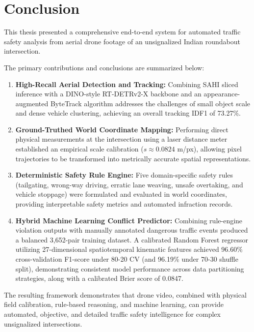 \chapter{Conclusion}
\label{chap:conclusion}

This thesis presented a comprehensive end-to-end system for automated traffic safety analysis from aerial drone footage of an unsignalized Indian roundabout intersection.

The primary contributions and conclusions are summarized below:
\begin{enumerate}
    \item \textbf{High-Recall Aerial Detection and Tracking:} Combining SAHI sliced inference with a DINO-style RT-DETRv2-X backbone
          and an appearance-augmented ByteTrack algorithm addresses the challenges of small object scale and dense vehicle clustering,
          achieving an overall tracking IDF1 of 73.27\%.
    \item \textbf{Ground-Truthed World Coordinate Mapping:} Performing direct physical measurements at the intersection using a laser distance
          meter established an empirical scale calibration ($s \approx 0.0824$ m/px), allowing pixel trajectories to be transformed into
          metrically accurate spatial representations.
    \item \textbf{Deterministic Safety Rule Engine:} Five domain-specific safety rules (tailgating, wrong-way driving, erratic lane weaving,
          unsafe overtaking, and vehicle stoppage) were formulated and evaluated in world coordinates, providing interpretable safety metrics
          and automated infraction records.
    \item \textbf{Hybrid Machine Learning Conflict Predictor:} Combining rule-engine violation outputs with manually annotated dangerous traffic
          events produced a balanced 3,652-pair training dataset. A calibrated Random Forest regressor utilizing 27-dimensional spatiotemporal
          kinematic features achieved 96.60\% cross-validation F1-score under 80-20 CV (and 96.19\% under 70-30 shuffle split), demonstrating consistent model performance across data partitioning strategies, along with a calibrated Brier score of 0.0847.
\end{enumerate}

The resulting framework demonstrates that drone video, combined with physical field calibration, rule-based reasoning, and machine learning,
can provide automated, objective, and detailed traffic safety intelligence for complex unsignalized intersections.